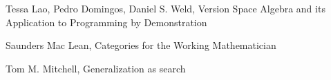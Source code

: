 \documentclass{article}
\theoremstyle{definition}
\begin{document}
\begin{thebibliography}{9}
Tessa Lao, Pedro Domingos, Daniel S. Weld, Version Space Algebra and its Application to Programming by Demonstration

Saunders Mac Lean, Categories for the Working Mathematician

Tom M. Mitchell, Generalization as search
\end{thebibliography}
\end{document}
